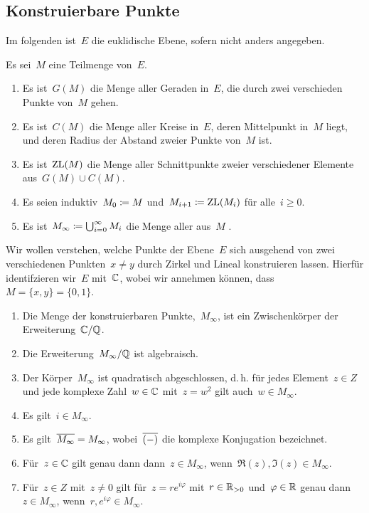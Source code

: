 \subsection{Konstruierbare Punkte}

\begin{convention}
  Im folgenden ist~$E$ die euklidische Ebene, sofern nicht anders angegeben.
\end{convention}

\begin{definition}
  Es sei~$M$ eine Teilmenge von~$E$.
  \begin{enumerate}
    \item
      Es ist~$G(M)$ die Menge aller Geraden in~$E$, die durch zwei verschieden Punkte von~$M$ gehen.
    \item
      Es ist~$C(M)$ die Menge aller Kreise in~$E$, deren Mittelpunkt in~$M$ liegt, und deren Radius der Abstand zweier Punkte von~$M$ ist.
    \item
      Es ist~$\operatorname{ZL}(M)$ die Menge aller Schnittpunkte zweier verschiedener Elemente aus~$G(M) \cup C(M)$.
    \item
      Es seien induktiv~$M_0 \coloneqq M$ und~$M_{i+1} \coloneqq \operatorname{ZL}(M_i)$ für alle~$i \geq 0$.
    \item
      Es ist~$M_{\infty} \coloneqq \bigcup_{i=0}^\infty M_i$ die Menge aller aus~$M$ .
  \end{enumerate}
\end{definition}

Wir wollen verstehen, welche Punkte der Ebene~$E$ sich ausgehend von zwei verschiedenen Punkten~$x \neq y$ durch Zirkel und Lineal konstruieren lassen.
Hierfür identifzieren wir~$E$ mit~$\mathbb{C}$, wobei wir annehmen können, dass~$M = \{ x, y \} = \{ 0, 1 \}$.

\begin{theorem}
  \leavevmode
  \begin{enumerate}
    \item
      Die Menge der konstruierbaren Punkte,~$M_{\infty}$, ist ein Zwischenkörper der Erweiterung~$\mathbb{C} / \mathbb{Q}$.
    \item
      Die Erweiterung~$M_{\infty} / \mathbb{Q}$ ist algebraisch.
    \item
      Der Körper~$M_{\infty}$ ist quadratisch abgeschlossen, d.\,h. für jedes Element~$z \in Z$ und jede komplexe Zahl~$w \in \mathbb{C}$ mit~$z = w^2$ gilt auch~$w \in M_{\infty}$.
    \item
      Es gilt~$i \in M_{\infty}$.
    \item
      Es gilt~$\overline{M_{\infty}} = M_{\infty}$, wobei~$\overline{(-)}$ die komplexe Konjugation bezeichnet.
    \item
      Für~$z \in \mathbb{C}$ gilt genau dann dann~$z \in M_{\infty}$, wenn~$\Re(z), \Im(z) \in M_{\infty}$.
    \item
      Für~$z \in Z$ mit~$z \neq 0$ gilt für~$z = r e^{i \varphi}$ mit~$r \in \mathbb{R}_{>0}$ und~$\varphi \in \mathbb{R}$ genau dann~$z \in M_{\infty}$, wenn~$r, e^{i \varphi} \in M_{\infty}$.
  \end{enumerate}
\end{theorem}

